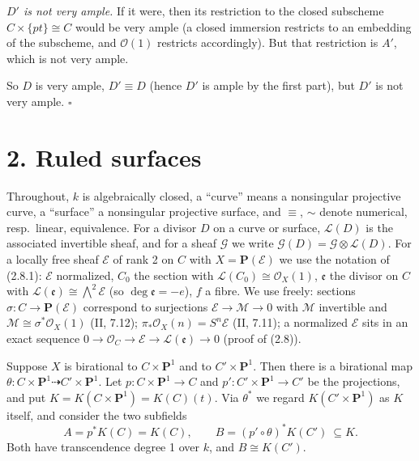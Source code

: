 \documentclass[11pt]{article}
\begin{document}
\emph{$D'$ is not very ample.} If it were, then its restriction to the closed subscheme $C\times\{pt\}\cong C$ would be very ample (a closed immersion restricts to an embedding of the subscheme, and $\mathcal O(1)$ restricts accordingly). But that restriction is $A'$, which is not very ample.

So $D$ is very ample, $D'\equiv D$ (hence $D'$ is ample by the first part), but $D'$ is not very ample. \hfill$\square$

\section*{2. Ruled surfaces}

Throughout, $k$ is algebraically closed, a ``curve'' means a nonsingular projective curve, a ``surface'' a nonsingular projective surface, and $\equiv$, $\sim$ denote numerical, resp.\ linear, equivalence. For a divisor $D$ on a curve or surface, $\mathcal L(D)$ is the associated invertible sheaf, and for a sheaf $\mathcal G$ we write $\mathcal G(D)=\mathcal G\otimes\mathcal L(D)$. For a locally free sheaf $\mathcal E$ of rank 2 on $C$ with $X=\mathbf P(\mathcal E)$ we use the notation of (2.8.1): $\mathcal E$ normalized, $C_0$ the section with $\mathcal L(C_0)\cong\mathcal O_X(1)$, $\mathfrak e$ the divisor on $C$ with $\mathcal L(\mathfrak e)\cong\bigwedge^2\mathcal E$ (so $\deg\mathfrak e=-e$), $f$ a fibre. We use freely: sections $\sigma\colon C\to\mathbf P(\mathcal E)$ correspond to surjections $\mathcal E\to\mathcal M\to0$ with $\mathcal M$ invertible and $\mathcal M\cong\sigma^*\mathcal O_X(1)$ (II, 7.12); $\pi_*\mathcal O_X(n)=S^n\mathcal E$ (II, 7.11); a normalized $\mathcal E$ sits in an exact sequence $0\to\mathcal O_C\to\mathcal E\to\mathcal L(\mathfrak e)\to0$ (proof of (2.8)).

\pf
Suppose $X$ is birational to $C\times\mathbf P^1$ and to $C'\times\mathbf P^1$. Then there is a birational map $\theta\colon C\times\mathbf P^1\dashrightarrow C'\times\mathbf P^1$. Let $p\colon C\times\mathbf P^1\to C$ and $p'\colon C'\times\mathbf P^1\to C'$ be the projections, and put $K=K(C\times\mathbf P^1)=K(C)(t)$. Via $\theta^*$ we regard $K(C'\times\mathbf P^1)$ as $K$ itself, and consider the two subfields
\[ A=p^*K(C)=K(C),\qquad B=(p'\circ\theta)^*K(C')\ \subseteq K . \]
Both have transcendence degree 1 over $k$, and $B\cong K(C')$.
\end{document}
